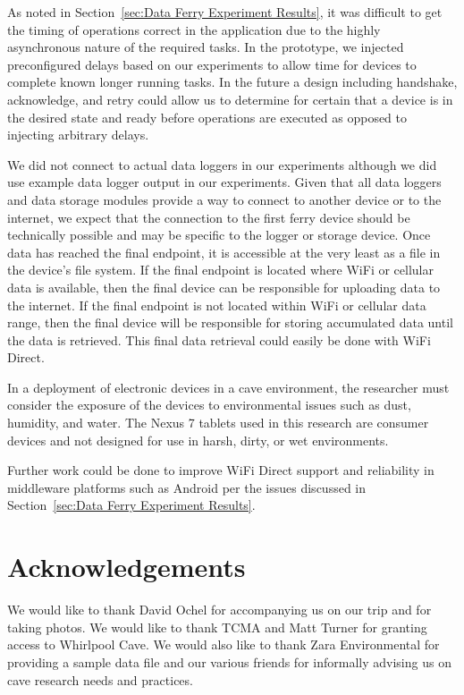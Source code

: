 \documentclass[10pt,twocolumn]{article}
\begin{document}
As noted in Section~\ref{sec:Data Ferry Experiment Results}, it was difficult to get the timing of operations correct in the application due to the highly asynchronous nature of the required tasks.
In the prototype, we injected preconfigured delays based on our experiments to allow time for devices to complete known longer running tasks.
In the future a design including handshake, acknowledge, and retry could allow us to determine for certain that a device is in the desired state and ready before operations are executed as opposed to injecting arbitrary delays.

We did not connect to actual data loggers in our experiments although we did use example data logger output in our experiments.
Given that all data loggers and data storage modules provide a way to connect to another device or to the internet, 
we expect that the connection to the first ferry device should be technically possible and may be specific to the logger or storage device.
Once data has reached the final endpoint, it is accessible at the very least as a file in the device's file system.
If the final endpoint is located where WiFi or cellular data is available, then the final device can be responsible for uploading data to the internet.
If the final endpoint is not located within WiFi or cellular data range, then the final device will be responsible for storing accumulated data until the data is retrieved.
This final data retrieval could easily be done with WiFi Direct.

In a deployment of electronic devices in a cave environment, the researcher must consider the exposure of the devices to environmental issues such as dust, humidity, and water.
The Nexus 7 tablets used in this research are consumer devices and not designed for use in harsh, dirty, or wet environments.

Further work could be done to improve WiFi Direct support and reliability in middleware platforms such as Android per the issues discussed in Section~\ref{sec:Data Ferry Experiment Results}.

\section{Acknowledgements}
\label{sec:Acknowledgements}
We would like to thank David Ochel for accompanying us on our trip and for taking photos. 
We would like to thank TCMA and Matt Turner for granting access to Whirlpool Cave. 
We would also like to thank Zara Environmental for providing a sample data file
and our various friends for informally advising us on cave research needs and practices.


\end{document}
